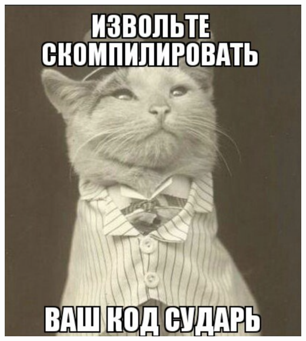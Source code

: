 \documentclass[11pt,aspectratio=169]{beamer}
\begin{document}
\begin{frame}{}

\begin{center}
\includegraphics[scale=0.4]{images/compile.png}
\end{center}

\end{frame}
\end{document}
